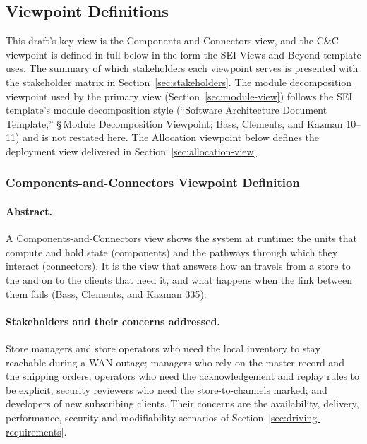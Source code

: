 \subsection{Viewpoint Definitions}
\label{sec:viewpoints}

This draft's key view is the Components-and-Connectors view, and the C\&C viewpoint is
defined in full below in the form the SEI Views and Beyond template uses. The summary of
which stakeholders each viewpoint serves is presented with the stakeholder matrix in
Section~\ref{sec:stakeholders}. The module decomposition viewpoint used by the primary
view (Section~\ref{sec:module-view}) follows the SEI template's module decomposition style
(``Software Architecture Document Template,'' \S\,Module Decomposition Viewpoint; Bass,
Clements, and Kazman 10--11) and is not restated here. The Allocation viewpoint
below defines the deployment view delivered in Section~\ref{sec:allocation-view}.

\subsubsection{Components-and-Connectors Viewpoint Definition}

\paragraph{Abstract.}
A Components-and-Connectors view shows the system at runtime: the units that compute
and hold state (components) and the pathways through which they interact (connectors).
It is the view that answers how an \InventoryEvent travels from a store to the \DC and
on to the clients that need it, and what happens when the link between them fails
(Bass, Clements, and Kazman 335).

\paragraph{Stakeholders and their concerns addressed.}
Store managers and store operators who need the local inventory to stay reachable
during a WAN outage; \DC managers who rely on the master record and the shipping
orders; operators who need the acknowledgement and replay rules to be explicit;
security reviewers who need the store-to-\DC channels marked; and developers of new
subscribing clients. Their concerns are the availability, delivery, performance,
security and modifiability scenarios of Section~\ref{sec:driving-requirements}.

